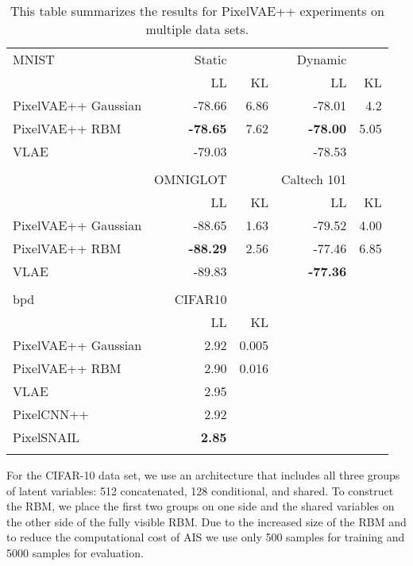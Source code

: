 \documentclass{article}
\begin{document}
\begin{table}
\footnotesize
\centering
\begin{tabular}{l r r r r}
\hline
MNIST                & Static          &      & Dynamic         &     \\
                     & LL              & KL   & LL              & KL  \\
\hline   
PixelVAE++ Gaussian  & -78.66          & 6.86 & -78.01          & 4.2 \\
PixelVAE++ RBM       & \textbf{-78.65} & 7.62 & \textbf{-78.00} & 5.05\\
\hline 
VLAE                 & -79.03          &      & -78.53          &     \\
\hline 

\\
                     & OMNIGLOT        &      & Caltech 101      &      \\
                     & LL              & KL   & LL               & KL   \\
\hline   
PixelVAE++ Gaussian  & -88.65          & 1.63 & -79.52           & 4.00 \\
PixelVAE++ RBM       & \textbf{-88.29} & 2.56 & -77.46           & 6.85 \\
\hline 
VLAE                 & -89.83          &      &  \textbf{-77.36} &      \\
\hline 


\\
bpd                 & CIFAR10         &      &       &      \\
                    & LL              & KL   &       &      \\
\hline   
PixelVAE++ Gaussian & 2.92            & 0.005&       &      \\
PixelVAE++ RBM      & 2.90            & 0.016&       &      \\
\hline 
VLAE                & 2.95            &      &       &      \\
PixelCNN++          & 2.92            &      &       &      \\
PixelSNAIL          & \textbf{2.85}   &      &       &      \\
\hline 
\\
\end{tabular}
\caption{This table summarizes the results for PixelVAE++ experiments on multiple data sets.}
\label{table:results}
\end{table}


For the CIFAR-10 data set, we use an architecture that includes all three groups of latent variables: 512 concatenated, 128 conditional, and  shared. To construct the RBM, we place the first two groups on one side and the shared variables on the other side of the fully visible RBM. Due to the increased size of the RBM and to reduce the computational cost of AIS we use only 500 samples for training and 5000 samples for evaluation.
\end{document}

